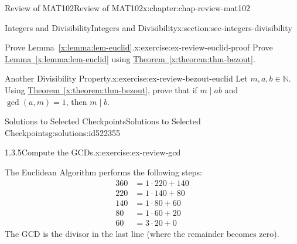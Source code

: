 \documentclass[oneside,10pt,]{book}
\newcommand{\xreffont}{\relax}
\numberwithin{equation}{section}
\newcommand{\amp}{&}
\begin{document}
\begin{chapterptx}{Review of MAT102}{}{Review of MAT102}{}{}{x:chapter:chap-review-mat102}
\begin{sectionptx}{Integers and Divisibility}{}{Integers and Divisibility}{}{}{x:section:sec-integers-divisibility}
\begin{inlineexercise}{Prove Lemma~{\xreffont\ref*{x:lemma:lem-euclid}}.}{x:exercise:ex-review-euclid-proof}%
Prove \hyperref[x:lemma:lem-euclid]{Lemma~{\xreffont\ref{x:lemma:lem-euclid}}} using \hyperref[x:theorem:thm-bezout]{Theorem~{\xreffont\ref{x:theorem:thm-bezout}}}.%
\end{inlineexercise}%
\begin{inlineexercise}{Another Divisibility Property.}{x:exercise:ex-review-bezout-euclid}%
Let \(m,a,b \in \mathbb{N}\). Using \hyperref[x:theorem:thm-bezout]{Theorem~{\xreffont\ref{x:theorem:thm-bezout}}}, prove that if \(m \mid ab\) and \(\gcd(a,m) = 1\), then \(m \mid b\).%
\end{inlineexercise}%
%
%
\typeout{************************************************}
\typeout{************************************************}
%
\begin{solutions-subsection-numberless}{Solutions to Selected Checkpoints}{}{Solutions to Selected Checkpoints}{}{}{g:solutions:id522355}
\begin{inlinesolution}{1.3.5}{Compute the GCDs.}{x:exercise:ex-review-gcd}%
\par\smallskip%
\noindent\hypertarget{g:solution:id522168-main}{}The Euclidean Algorithm performs the following steps:%
\begin{align*}
360 \amp = 1 \cdot 220 + 140 \\
220 \amp = 1 \cdot 140 + 80 \\
140 \amp = 1 \cdot 80 + 60 \\
80 \amp = 1 \cdot 60 + 20 \\
60 \amp = 3 \cdot 20 + 0 
\end{align*}
The GCD is the divisor in the last line (where the remainder becomes zero).%
\end{inlinesolution}%
\end{solutions-subsection-numberless}
\end{sectionptx}
\end{chapterptx}
%
%
\typeout{************************************************}
\typeout{************************************************}
%
\end{document}
